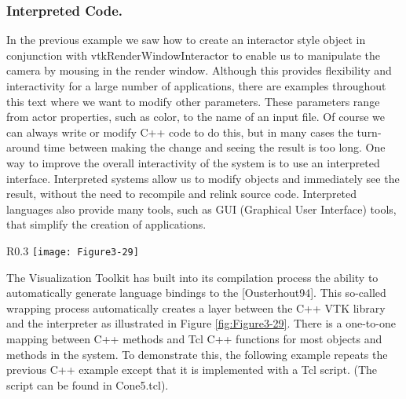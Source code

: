 \subsubsection{Interpreted Code.}
\label{subsec:interpreted_code}
In the previous example we saw how to create an interactor style object in conjunction with vtkRenderWindowInteractor to enable us to manipulate the camera by mousing in the render window. Although this provides flexibility and interactivity for a large number of applications, there are examples throughout this text where we want to modify other parameters. These parameters range from actor properties, such as color, to the name of an input file. Of course we can always write or modify C++ code to do this, but in many cases the turn-around time between making the change and seeing the result is too long. One way to improve the overall interactivity of the system is to use an interpreted interface. Interpreted systems allow us to modify objects and immediately see the result, without the need to recompile and relink source code. Interpreted languages also provide many tools, such as GUI (Graphical User Interface) tools, that simplify the creation of applications.

\begin{wrapfigure}{R}{0.3\linewidth}
  \centering
  \texttt{[image: Figure3-29]}\\
  \caption{In VTK the C++ library is automatically wrapped with the interpreted languages Tcl, Python, and Java.}\label{fig:Figure3-29}
\end{wrapfigure}

The Visualization Toolkit has built into its compilation process the ability to automatically generate language bindings to the [Ousterhout94]. This so-called wrapping process automatically creates a layer between the C++ VTK library and the interpreter as illustrated in Figure \ref{fig:Figure3-29}. There is a one-to-one mapping between C++ methods and Tcl C++ functions for most objects and methods in the system. To demonstrate this, the following example repeats the previous C++ example except that it is implemented with a Tcl script. (The script can be found in Cone5.tcl).

